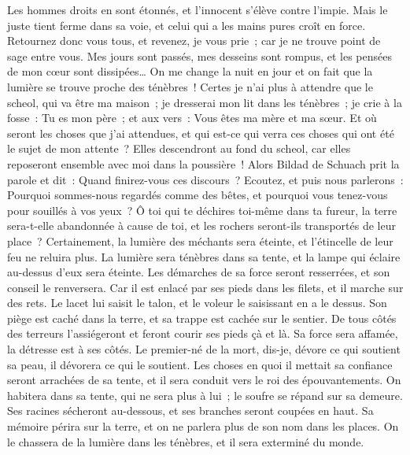 \begin{multicols}{2}
Les hommes droits en sont étonnés, et l'innocent s'élève contre l'impie.
Mais le juste tient ferme dans sa voie, et celui qui a les mains pures croît en force.
Retournez donc vous tous, et revenez, je vous prie~; car je ne trouve point de sage entre vous.
Mes jours sont passés, mes desseins sont rompus, et les pensées de mon cœur sont dissipées…
On me change la nuit en jour et on fait que la lumière se trouve proche des ténèbres~!
Certes je n'ai plus à attendre que le scheol, qui va être ma maison~; je dresserai mon lit dans les ténèbres~;
je crie à la fosse~: Tu es mon père~; et aux vers~: Vous êtes ma mère et ma sœur.
Et où seront les choses que j'ai attendues, et qui est-ce qui verra ces choses qui ont été le sujet de mon attente~?
Elles descendront au fond du scheol, car elles reposeront ensemble avec moi dans la poussière~!
\VerseOne{}Alors Bildad de Schuach prit la parole et dit~:
Quand finirez-vous ces discours~? Ecoutez, et puis nous parlerons~:
Pourquoi sommes-nous regardés comme des bêtes, et pourquoi vous tenez-vous pour souillés à vos yeux~?
Ô toi qui te déchires toi-même dans ta fureur, la terre sera-t-elle abandonnée à cause de toi, et les rochers seront-ils transportés de leur place~?
Certainement, la lumière des méchants sera éteinte, et l'étincelle de leur feu ne reluira plus.
La lumière sera ténèbres dans sa tente, et la lampe qui éclaire au-dessus d'eux sera éteinte.
Les démarches de sa force seront resserrées, et son conseil le renversera.
Car il est enlacé par ses pieds dans les filets, et il marche sur des rets.
Le lacet lui saisit le talon, et le voleur le saisissant en a le dessus.
Son piège est caché dans la terre, et sa trappe est cachée sur le sentier.
De tous côtés des terreurs l'assiégeront et feront courir ses pieds çà et là.
Sa force sera affamée, la détresse est à ses côtés.
Le premier-né de la mort, dis-je, dévore ce qui soutient sa peau, il dévorera ce qui le soutient.
 Les choses en quoi il mettait sa confiance seront arrachées de sa tente, et il sera conduit vers le roi des épouvantements.
On habitera dans sa tente, qui ne sera plus à lui~; le soufre se répand sur sa demeure.
Ses racines sécheront au-dessous, et ses branches seront coupées en haut.
Sa mémoire périra sur la terre, et on ne parlera plus de son nom dans les places.
On le chassera de la lumière dans les ténèbres, et il sera exterminé du monde.

\end{multicols}

